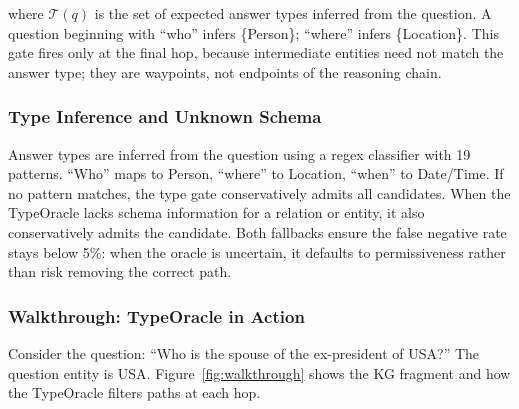 where $\mathcal{T}(q)$ is the set of expected answer types inferred from the question. A
question beginning with ``who'' infers \{Person\}; ``where'' infers \{Location\}. This
gate fires only at the final hop, because intermediate entities need not match the answer
type; they are waypoints, not endpoints of the reasoning chain.

\subsubsection{Type Inference and Unknown Schema}

Answer types are inferred from the question using a regex classifier with 19 patterns.
``Who'' maps to Person, ``where'' to Location, ``when'' to Date/Time. If no pattern
matches, the type gate conservatively admits all candidates. When the TypeOracle lacks
schema information for a relation or entity, it also conservatively admits the
candidate. Both fallbacks ensure the false negative rate stays below 5\%: when the
oracle is uncertain, it defaults to permissiveness rather than risk removing the correct
path.

\subsubsection{Walkthrough: TypeOracle in Action}

Consider the question: ``Who is the spouse of the ex-president of USA?'' The question
entity is USA. Figure~\ref{fig:walkthrough} shows the KG fragment and how the TypeOracle
filters paths at each hop.

